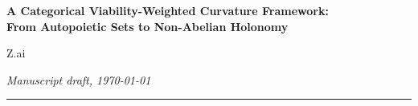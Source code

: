 \documentclass[11pt,a4paper]{article}
\theoremstyle{plain}
\theoremstyle{definition}
\theoremstyle{remark}
\begin{document}
\begin{center}
  \vspace*{0.4em}
  {\large\bfseries A Categorical Viability-Weighted Curvature Framework:\\
   From Autopoietic Sets to Non-Abelian Holonomy\par}
  \vspace{0.8em}
  {\normalsize Z.ai\par}
  \vspace{0.2em}
  {\small\itshape Manuscript draft, \today\par}
  \vspace{0.6em}
  \rule{0.7\textwidth}{0.4pt}
\end{center}
\end{document}
